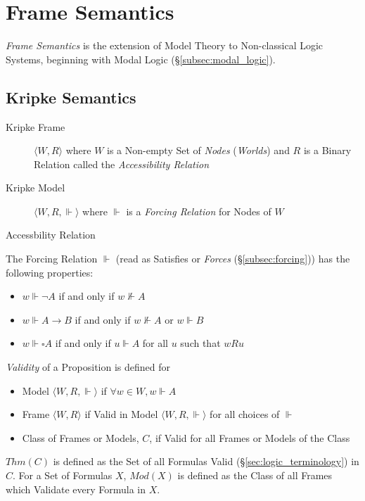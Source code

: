 \documentclass{article}
\begin{document}
\section{Frame Semantics}\label{sec:frame_semantics}

\emph{Frame Semantics} is the extension of Model Theory to
Non-classical Logic Systems, beginning with Modal Logic
(\S\ref{subsec:modal_logic}).

\subsection{Kripke Semantics}\label{subsec:kripke_semantics}

\begin{description}
\item [Kripke Frame] $\langle W,R \rangle$ where $W$ is a Non-empty
  Set of \emph{Nodes} (\emph{Worlds}) and $R$ is a Binary Relation
  called the \emph{Accessibility Relation}
\item [Kripke Model] $\langle W,R,\Vdash \rangle$ where $\Vdash$ is a
  \emph{Forcing Relation} for Nodes of $W$
\end{description}
Accessbility Relation %

The Forcing Relation $\Vdash$ (read as Satisfies or \emph{Forces}
(\S\ref{subsec:forcing})) has the following properties:
\begin{itemize}
\item $w \Vdash \neg A$ if and only if $w \nVdash A$
\item $w \Vdash A \rightarrow B$ if and only if $w \nVdash A$ or $w
  \Vdash B$
\item $w \Vdash \square A$ if and only if $u \Vdash A$ for all $u$
  such that $w R u$
\end{itemize}
\emph{Validity} of a Proposition is defined for
\begin{itemize}
\item Model $\langle W,R, \Vdash \rangle$ if $\forall w \in W,
  w \Vdash A$
\item Frame $\langle W,R \rangle$ if Valid in Model $\langle W,R,
  \Vdash \rangle$ for all choices of $\Vdash$
\item Class of Frames or Models, $C$, if Valid for all Frames or
  Models of the Class
\end{itemize}
$Thm(C)$ is defined as the Set of all Formulas Valid
(\S\ref{sec:logic_terminology}) in $C$. For a Set of Formulas $X$,
$Mod(X)$ is defined as the Class of all Frames which Validate every
Formula in $X$.
\end{document}
